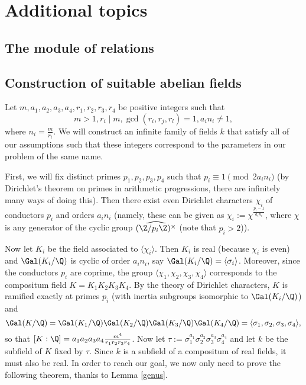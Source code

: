 \chapter{Additional topics}

\section{The module of relations}
\section{Construction of suitable abelian fields}
Let $m,a_1,a_2,a_3,a_4,r_1,r_2,r_3,r_4$ be positive integers such that 
$$m>1, r_i\mid m, \gcd(r_i,r_j,r_l)=1, a_in_i\neq 1,$$
where $n_i=\frac{m}{r_i}$.
We will construct an infinite family of fields $k$ that satisfy all of our assumptions such that these integers correspond to the parameters in our problem of the same name.

First, we will fix distinct primes $p_1,p_2,p_3,p_4$ such that $p_i\equiv 1\pmod{ 2a_in_i}$ (by Dirichlet's theorem on primes in arithmetic progressions, there are infinitely many ways of doing this). Then there exist even Dirichlet characters $\chi_i$ of conductors $p_i$ and orders $a_in_i$ (namely, these can be given as $\chi_i:=\chi^{\frac{p_i-1}{a_in_i}}$, where $\chi$ is any generator of the cyclic group $\widehat{(\Z/p_i\Z)^\times}$ (note that $p_i>2$)).

Now let $K_i$ be the field associated to $\langle \chi_i\rangle$. Then $K_i$ is real (because $\chi_i$ is even) and $\Gal(K_i/\Q)$ is cyclic of order $a_in_i$, say $\Gal(K_i/\Q)=\langle \sigma_i\rangle$. Moreover, since the conductors $p_i$ are coprime, the group $\langle \chi_1,\chi_2,\chi_3,\chi_4\rangle$ corresponds to the compositum field $K=K_1K_2K_3K_4$. By the theory of Dirichlet characters, $K$ is ramified exactly at primes $p_i$ (with inertia subgroups isomorphic to $\Gal(K_i/\Q)$) and $$\Gal(K/\Q)=\Gal(K_1/\Q)\Gal(K_2/\Q)\Gal(K_3/\Q)\Gal(K_4/\Q)=\langle\sigma_1,\sigma_2,\sigma_3,\sigma_4\rangle,$$
so that $[K:\Q]=a_1a_2a_3a_4\frac{m^4}{r_1r_2r_3r_4}$. Now let $\tau:=\sigma_1^{a_1}\sigma_2^{a_2}\sigma_3^{a_3}\sigma_4^{a_4}$ and let $k$ be the subfield of $K$ fixed by $\tau$. Since $k$ is a subfield of a compositum of real fields, it must also be real. In order to reach our goal, we now only need to prove the following theorem, thanks to Lemma \ref{genus}. %

